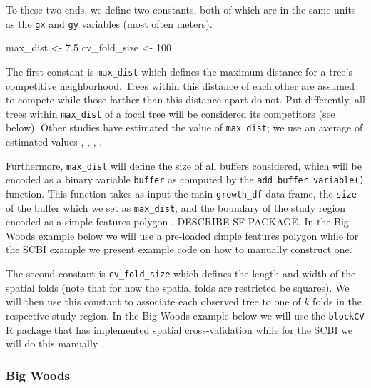 \documentclass[12pt]{article}
\newenvironment{Shaded}{\begin{snugshade}}{\end{snugshade}}
\newcommand{\DecValTok}[1]{\textcolor[rgb]{0.00,0.00,0.81}{#1}}
\newcommand{\FloatTok}[1]{\textcolor[rgb]{0.00,0.00,0.81}{#1}}
\newcommand{\NormalTok}[1]{#1}
\newcommand{\StringTok}[1]{\textcolor[rgb]{0.31,0.60,0.02}{#1}}
\begin{document}
To these two ends, we define two constants, both of which are in the
same units as the \texttt{gx} and \texttt{gy} variables (most often
meters).

\begin{Shaded}
\begin{Highlighting}[]
\NormalTok{max_dist <-}\StringTok{ }\FloatTok{7.5}
\NormalTok{cv_fold_size <-}\StringTok{ }\DecValTok{100}
\end{Highlighting}
\end{Shaded}

The first constant is \texttt{max\_dist} which defines the maximum
distance for a tree's competitive neighborhood. Trees within this
distance of each other are assumed to compete while those farther than
this distance apart do not. Put differently, all trees within
\texttt{max\_dist} of a focal tree will be considered its competitors
(see below). Other studies have estimated the value of
\texttt{max\_dist}; we use an average of estimated values
\citet{canham_neighborhood_2004}, \citet{uriarte_spatially_2004},
\citet{tatsumi2013}, \citet{canham_neighborhood_2006}.

Furthermore, \texttt{max\_dist} will define the size of all buffers
considered, which will be encoded as a binary variable \texttt{buffer}
as computed by the \texttt{add\_buffer\_variable()} function. This
function takes as input the main \texttt{growth\_df} data frame, the
\texttt{size} of the buffer which we set as \texttt{max\_dist}, and the
boundary of the study region encoded as a simple features polygon
\citet{pebesma_simple_2018}. DESCRIBE SF PACKAGE. In the Big Woods
example below we will use a pre-loaded simple features polygon while for
the SCBI example we present example code on how to manually construct
one.

The second constant is \texttt{cv\_fold\_size} which defines the length
and width of the spatial folds (note that for now the spatial folds are
restricted be squares). We will then use this constant to associate each
observed tree to one of \(k\) folds in the respective study region. In
the Big Woods example below we will use the \texttt{blockCV} R package
that has implemented spatial cross-validation while for the SCBI we will
do this manually \citet{valavi2019}.

\hypertarget{big-woods-2}{%
\subsubsection{Big Woods}\label{big-woods-2}}
\end{document}
